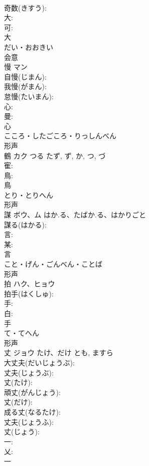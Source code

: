 \documentclass[8pt]{extreport}
\begin{document}
\begin{CJK}{UTF8}{min}
\\	奇数(きすう): 
\\	大: 
\\	可: 
\\	大	
\\	だい・おおきい	
\\	会意 
\\	慢	マン			
\\	自慢(じまん): 
\\	我慢(がまん): 
\\	怠慢(たいまん): 
\\	心: 
\\	曼: 
\\	心	
\\	こころ・したごころ・りっしんべん	
\\	形声 
\\	鶴	カク	つる	たず, ず, か, つ, づ	
\\	寉: 
\\	鳥: 
\\	鳥	
\\	とり・とりへん	
\\	形声 
\\	謀	ボウ、ム	はか.る、たばか.る、はかりごと		
\\	謀る(はかる): 
\\	言: 
\\	某: 
\\	言	
\\	こと・げん・ごんべん・ことば	
\\	形声 
\\	拍	ハク、ヒョウ			
\\	拍手(はくしゅ): 
\\	手: 
\\	白: 
\\	手	
\\	て・てへん	
\\	形声 
\\	丈	ジョウ	たけ、だけ	とも, ますら	
\\	大丈夫(だいじょうぶ): 
\\	丈夫(じょうぶ): 
\\	丈(たけ): 
\\	頑丈(がんじょう): 
\\	丈(だけ): 
\\	成る丈(なるたけ): 
\\	丈夫(じょうふ): 
\\	丈(じょう): 
\\	一: 
\\	乂: 
\\	一	

\end{CJK}
\end{document}
